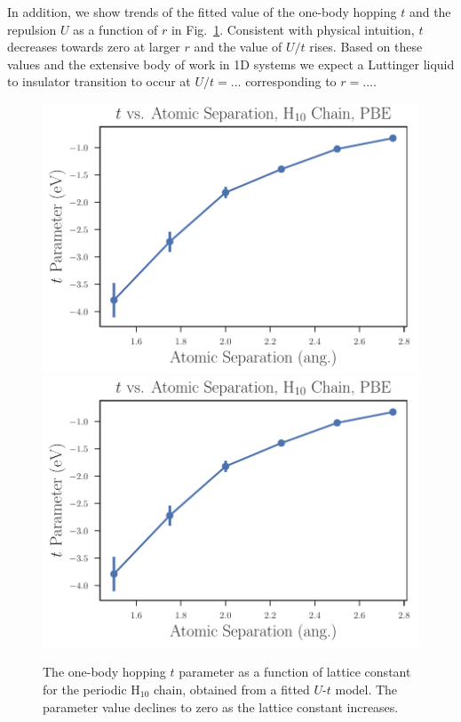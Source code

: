 In addition, we show trends of the fitted value of the one-body hopping $t$ and the repulsion $U$ as a function of $r$ 
in Fig.~\ref{fig:Parameters-vs-Bond-t}. Consistent with physical intuition, $t$ decreases towards zero at larger $r$
and the value of $U/t$ rises. Based on these values and the extensive body of work in 1D systems we expect a Luttinger liquid 
to insulator transition to occur at $U/t=...$ corresponding to $r=...$.  

\begin{figure}
\centering
\includegraphics[scale=0.5]{./Figures/$t$_vs_separation_h_chain_ols.pdf}
\includegraphics[scale=0.5]{./Figures/$t$_vs_separation_h_chain_ols.pdf}
\caption{ The one-body hopping $t$ parameter as a function of lattice constant for the periodic H$_{10}$ chain, obtained from a fitted $U$-$t$ model. The parameter value declines to zero as the lattice constant increases. }\label{fig:Parameters-vs-Bond-t}

\end{figure}
